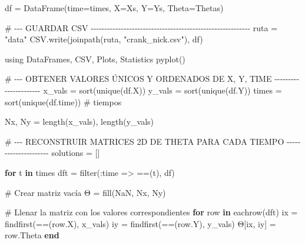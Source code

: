 \documentclass[
  spanish,
  us-letterpaper,
  DIV=11,
  numbers=noendperiod]{scrreprt}
\newenvironment{Shaded}{\begin{snugshade}}{\end{snugshade}}
\newcommand{\BuiltInTok}[1]{\textcolor[rgb]{0.00,0.23,0.31}{#1}}
\newcommand{\CommentTok}[1]{\textcolor[rgb]{0.37,0.37,0.37}{#1}}
\newcommand{\ConstantTok}[1]{\textcolor[rgb]{0.56,0.35,0.01}{#1}}
\newcommand{\ControlFlowTok}[1]{\textcolor[rgb]{0.00,0.23,0.31}{\textbf{#1}}}
\newcommand{\FunctionTok}[1]{\textcolor[rgb]{0.28,0.35,0.67}{#1}}
\newcommand{\ImportTok}[1]{\textcolor[rgb]{0.00,0.46,0.62}{#1}}
\newcommand{\KeywordTok}[1]{\textcolor[rgb]{0.00,0.23,0.31}{\textbf{#1}}}
\newcommand{\NormalTok}[1]{\textcolor[rgb]{0.00,0.23,0.31}{#1}}
\newcommand{\OperatorTok}[1]{\textcolor[rgb]{0.37,0.37,0.37}{#1}}
\newcommand{\StringTok}[1]{\textcolor[rgb]{0.13,0.47,0.30}{#1}}
\theoremstyle{definition}
\theoremstyle{plain}
\theoremstyle{remark}
\begin{document}
\begin{Shaded}
\begin{Highlighting}[]
\NormalTok{df }\OperatorTok{=} \FunctionTok{DataFrame}\NormalTok{(time}\OperatorTok{=}\NormalTok{times, X}\OperatorTok{=}\NormalTok{Xs, Y}\OperatorTok{=}\NormalTok{Ys, Theta}\OperatorTok{=}\NormalTok{Thetas)}

\CommentTok{\# {-}{-}{-} GUARDAR CSV {-}{-}{-}{-}{-}{-}{-}{-}{-}{-}{-}{-}{-}{-}{-}{-}{-}{-}{-}{-}{-}{-}{-}{-}{-}{-}{-}{-}{-}{-}{-}{-}{-}{-}{-}{-}{-}{-}{-}{-}{-}{-}{-}{-}{-}{-}{-}{-}{-}{-}{-}{-}{-}{-}{-}{-}{-}{-}}
\NormalTok{ruta }\OperatorTok{=} \StringTok{"data"}
\NormalTok{CSV.}\FunctionTok{write}\NormalTok{(}\FunctionTok{joinpath}\NormalTok{(ruta, }\StringTok{"crank\_nick.csv"}\NormalTok{), df)}
\end{Highlighting}
\end{Shaded}

\begin{Shaded}
\begin{Highlighting}[]
\ImportTok{using} \BuiltInTok{DataFrames}\NormalTok{, }\BuiltInTok{CSV}\NormalTok{, }\BuiltInTok{Plots}\NormalTok{, }\BuiltInTok{Statistics}
\FunctionTok{pyplot}\NormalTok{()}

\CommentTok{\# {-}{-}{-} OBTENER VALORES ÚNICOS Y ORDENADOS DE X, Y, TIME {-}{-}{-}{-}{-}{-}{-}{-}{-}{-}{-}{-}{-}{-}{-}{-}{-}{-}{-}{-}{-}{-}}
\NormalTok{x\_vals }\OperatorTok{=} \FunctionTok{sort}\NormalTok{(}\FunctionTok{unique}\NormalTok{(df.X))}
\NormalTok{y\_vals }\OperatorTok{=} \FunctionTok{sort}\NormalTok{(}\FunctionTok{unique}\NormalTok{(df.Y))}
\NormalTok{times }\OperatorTok{=} \FunctionTok{sort}\NormalTok{(}\FunctionTok{unique}\NormalTok{(df.time))  }\CommentTok{\# tiempos}

\NormalTok{Nx, Ny }\OperatorTok{=} \FunctionTok{length}\NormalTok{(x\_vals), }\FunctionTok{length}\NormalTok{(y\_vals)}

\CommentTok{\# {-}{-}{-} RECONSTRUIR MATRICES 2D DE THETA PARA CADA TIEMPO {-}{-}{-}{-}{-}{-}{-}{-}{-}{-}{-}{-}{-}{-}{-}{-}{-}{-}{-}{-}{-}}
\NormalTok{solutions }\OperatorTok{=}\NormalTok{ []}

\ControlFlowTok{for}\NormalTok{ t }\KeywordTok{in}\NormalTok{ times}
\NormalTok{    dft }\OperatorTok{=} \FunctionTok{filter}\NormalTok{(}\OperatorTok{:}\NormalTok{time }\OperatorTok{=\textgreater{}} \OperatorTok{==}\NormalTok{(t), df)}

    \CommentTok{\# Crear matriz vacía}
\NormalTok{    Θ }\OperatorTok{=} \FunctionTok{fill}\NormalTok{(}\ConstantTok{NaN}\NormalTok{, Nx, Ny)}

    \CommentTok{\# Llenar la matriz con los valores correspondientes}
    \ControlFlowTok{for}\NormalTok{ row }\KeywordTok{in} \FunctionTok{eachrow}\NormalTok{(dft)}
\NormalTok{        ix }\OperatorTok{=} \FunctionTok{findfirst}\NormalTok{(}\OperatorTok{==}\NormalTok{(row.X), x\_vals)}
\NormalTok{        iy }\OperatorTok{=} \FunctionTok{findfirst}\NormalTok{(}\OperatorTok{==}\NormalTok{(row.Y), y\_vals)}
\NormalTok{        Θ[ix, iy] }\OperatorTok{=}\NormalTok{ row.Theta}
    \ControlFlowTok{end}


\end{Highlighting}
\end{Shaded}
\end{document}
